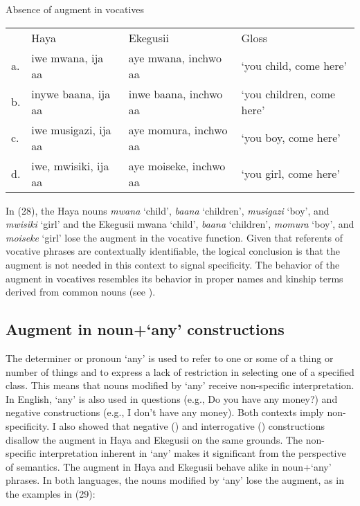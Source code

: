 \documentclass[output=paper]{langscibook}
\begin{document}
\begin{exe}
\ex Absence of augment in vocatives \\
\label{hayagusii28}
\begin{tabular}{llll}
        &     Haya	&		Ekegusii	&		Gloss	\\	 
a. &	iwe mwana, ija aa &	aye mwana, inchwo aa &	‘you child, come here’   \\		
b. &	inywe baana, ija aa  &	inwe baana, inchwo aa &	‘you children, come here’ \\
c. &	iwe musigazi, ija aa &	aye momura, inchwo aa &	‘you boy, come here’ \\	
d. &	iwe, mwisiki, ija aa &	aye moiseke, inchwo aa &	‘you girl, come here’ \\

\end{tabular}
\end{exe}
In (28), the Haya nouns \textit{mwana} ‘child’, \textit{baana} ‘children’, \textit{musigazi} ‘boy’, and \textit{mwisiki} ‘girl’ and the Ekegusii mwana ‘child’, \textit{baana} ‘children’, \textit{momura} ‘boy’, and \textit{moiseke} ‘girl’ lose the augment in the vocative function. Given that referents of vocative phrases are contextually identifiable, the logical conclusion is that the augment is not needed in this context to signal specificity. The behavior of the augment in vocatives resembles its behavior in proper names and kinship terms derived from common nouns (see ).  

\subsection{Augment in noun+`any’ constructions}
The determiner or pronoun ‘any’ is used to refer to one or some of a thing or number of things and to express a lack of restriction in selecting one of a specified class. This means that nouns modified by ‘any’ receive non-specific interpretation. In English, ‘any’ is also used in questions (e.g., Do you have any money?) and negative constructions (e.g., I don’t have any money). Both contexts imply non-specificity. I also showed that negative () and interrogative () constructions disallow the augment in Haya and Ekegusii on the same grounds. The non-specific interpretation inherent in ‘any’ makes it significant from the perspective of semantics. The augment in Haya and Ekegusii behave alike in noun+‘any’ phrases. In both languages, the nouns modified by ‘any’ lose the augment, as in the examples in (29):
\end{document}
